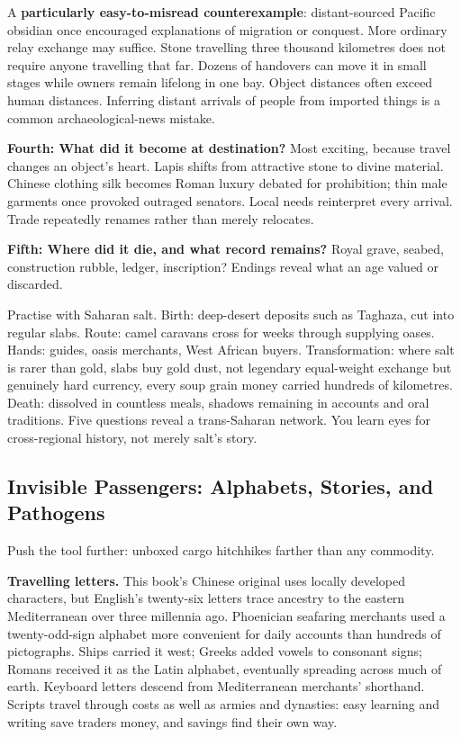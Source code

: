 A \textbf{particularly easy-to-misread counterexample}: distant-sourced Pacific obsidian once encouraged explanations of migration or conquest. More ordinary relay exchange may suffice. Stone travelling three thousand kilometres does not require anyone travelling that far. Dozens of handovers can move it in small stages while owners remain lifelong in one bay. Object distances often exceed human distances. Inferring distant arrivals of people from imported things is a common archaeological-news mistake.

\textbf{Fourth: What did it become at destination?} Most exciting, because travel changes an object's heart. Lapis shifts from attractive stone to divine material. Chinese clothing silk becomes Roman luxury debated for prohibition; thin male garments once provoked outraged senators. Local needs reinterpret every arrival. Trade repeatedly renames rather than merely relocates.

\textbf{Fifth: Where did it die, and what record remains?} Royal grave, seabed, construction rubble, ledger, inscription? Endings reveal what an age valued or discarded.

Practise with Saharan salt. Birth: deep-desert deposits such as Taghaza, cut into regular slabs. Route: camel caravans cross for weeks through supplying oases. Hands: guides, oasis merchants, West African buyers. Transformation: where salt is rarer than gold, slabs buy gold dust, not legendary equal-weight exchange but genuinely hard currency, every soup grain money carried hundreds of kilometres. Death: dissolved in countless meals, shadows remaining in accounts and oral traditions. Five questions reveal a trans-Saharan network. You learn eyes for cross-regional history, not merely salt's story.

\subsection[Invisible Passengers]{Invisible Passengers: Alphabets, Stories, and Pathogens}
Push the tool further: unboxed cargo hitchhikes farther than any commodity.

\textbf{Travelling letters.} This book's Chinese original uses locally developed characters, but English's twenty-six letters trace ancestry to the eastern Mediterranean over three millennia ago. Phoenician seafaring merchants used a twenty-odd-sign alphabet more convenient for daily accounts than hundreds of pictographs. Ships carried it west; Greeks added vowels to consonant signs; Romans received it as the Latin alphabet, eventually spreading across much of earth. Keyboard letters descend from Mediterranean merchants' shorthand. Scripts travel through costs as well as armies and dynasties: easy learning and writing save traders money, and savings find their own way.

